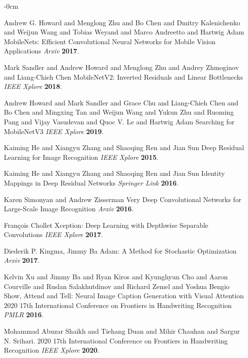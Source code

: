 \documentclass[sensors,article,submit,pdftex,moreauthors]{Definitions/mdpi}
\begin{document}
\begin{adjustwidth}{-\extralength}{0cm}
\begin{thebibliography}{999}
			Andrew G. Howard and Menglong Zhu and Bo Chen and Dmitry Kalenichenko and Weijun Wang and Tobias Weyand and Marco Andreetto and Hartwig Adam MobileNets: Efficient Convolutional Neural Networks for Mobile Vision Applications
			{\em Arxiv} 
			{\bf 2017}.
			
			Mark Sandler and Andrew Howard and Menglong Zhu and Andrey Zhmoginov and Liang-Chieh Chen MobileNetV2: Inverted Residuals and Linear Bottlenecks
			{\em IEEE Xplore} 
			{\bf 2018}.
			
			Andrew Howard and Mark Sandler and Grace Chu and Liang-Chieh Chen and Bo Chen and Mingxing Tan and Weijun Wang and Yukun Zhu and Ruoming Pang and Vijay Vasudevan and Quoc V. Le and Hartwig Adam Searching for MobileNetV3
			{\em IEEE Xplore} 
			{\bf 2019}.
			
			Kaiming He and Xiangyu Zhang and Shaoqing Ren and Jian Sun Deep Residual Learning for Image Recognition
			{\em IEEE Xplore} 
			{\bf 2015}.
			
			Kaiming He and Xiangyu Zhang and Shaoqing Ren and Jian Sun Identity Mappings in Deep Residual Networks
			{\em Springer Link} 
			{\bf 2016}.
			
			Karen Simonyan and Andrew Zisserman Very Deep Convolutional Networks for Large-Scale Image Recognition
			{\em Arxiv} 
			{\bf 2016}.
			
			François Chollet Xception: Deep Learning with Depthwise Separable Convolutions
			{\em IEEE Xplore} 
			{\bf 2017}.
			
			Diederik P. Kingma, Jimmy Ba Adam: A Method for Stochastic Optimization
			{\em Arxiv} 
			{\bf 2017}.
			
			Kelvin Xu and Jimmy Ba and Ryan Kiros and Kyunghyun Cho and Aaron Courville and Ruslan Salakhutdinov and Richard Zemel and Yoshua Bengio Show, Attend and Tell: Neural Image Caption Generation with Visual Attention 2020 17th International Conference on Frontiers in Handwriting Recognition
			{\em PMLR} 
			{\bf 2016}.
			
			Mohammad Abuzar Shaikh and Tiehang Duan and Mihir Chauhan and Sargur N. Srihari. 2020 17th International Conference on Frontiers in Handwriting Recognition
			{\em IEEE Xplore} 
			{\bf 2020}.
			

\end{thebibliography}
\end{adjustwidth}
\end{document}
